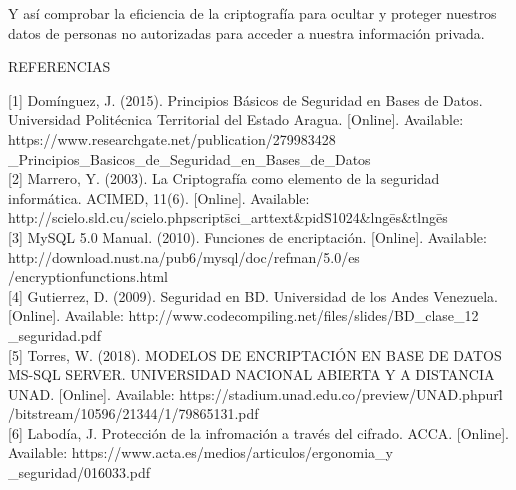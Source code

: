 \documentclass[9pt,24pt,twocolumn]{article}
\begin{document}
{Y así comprobar la eficiencia de la criptografía para ocultar y proteger nuestros datos de personas no autorizadas
para acceder a nuestra información privada.}

\begin{center}
{REFERENCIAS}
\end{center}

{[1] Domínguez, J. (2015). Principios Básicos de Seguridad en Bases de Datos. Universidad Politécnica Territorial del Estado Aragua. [Online]. Available: }
{https://www.researchgate.net/publication/279983428
\_Principios\_Basicos\_de\_Seguridad\_en\_Bases\_de\_Datos}
\\

{[2] Marrero, Y. (2003). La Criptografía como elemento de la seguridad informática. ACIMED, 11(6). [Online]. Available: }
{http://scielo.sld.cu/scielo.php\?script\=sci\_arttext\&pid\=S1024\&lng\=es\&tlng\=es}
\\

{[3] MySQL 5.0 Manual. (2010). Funciones de encriptación. [Online]. Available: }
{http://download.nust.na/pub6/mysql/doc/refman/5.0/es
/encryption\-functions.html}
\\

{[4] Gutierrez, D. (2009). Seguridad en BD. Universidad de los Andes Venezuela. [Online]. Available: }
{http://www.codecompiling.net/files/slides/BD\_clase\_12}
{\_seguridad.pdf}
\\

{[5] Torres, W. (2018). MODELOS DE ENCRIPTACIÓN EN BASE DE DATOS MS-SQL SERVER. UNIVERSIDAD NACIONAL ABIERTA Y A DISTANCIA UNAD. [Online]. Available: }
{https://stadium.unad.edu.co/preview/UNAD.php\?url\=}
{/bitstream/10596/21344/1/79865131.pdf}
\\

{[6] Labodía, J. Protección de la infromación a través del cifrado. ACCA. [Online]. Available: }
{https://www.acta.es/medios/articulos/ergonomia\_y}
{\_seguridad/016033.pdf}
\end{document}
